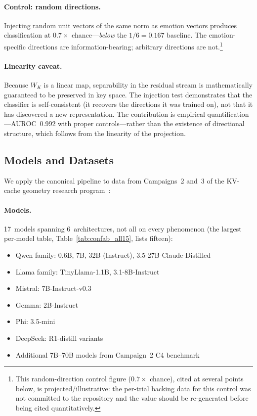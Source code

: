 \documentclass[11pt,a4paper]{article}
\begin{document}
\paragraph{Control: random directions.} Injecting random unit vectors of the
same norm as emotion vectors produces classification at $0.7\times$
chance---\emph{below} the $1/6 = 0.167$ baseline. The emotion-specific
directions are information-bearing; arbitrary directions are not.\footnote{This random-direction control figure ($0.7\times$ chance), cited at several points below, is projected/illustrative: the per-trial backing data for this control was not committed to the repository and the value should be re-generated before being cited quantitatively.}

\paragraph{Linearity caveat.} Because $W_K$ is a linear map, separability
in the residual stream is mathematically guaranteed to be preserved in key
space. The injection test demonstrates that the classifier is self-consistent
(it recovers the directions it was trained on), not that it has discovered
a new representation. The contribution is empirical quantification---AUROC~0.992
with proper controls---rather than the existence of directional structure,
which follows from the linearity of the projection.

\subsection{Models and Datasets}
\label{sec:datasets}

We apply the canonical pipeline to data from Campaigns~2 and~3 of the
KV-cache geometry research program~\citep{lyra_p2,lyra_spectral,lyra_delta}:

\paragraph{Models.} 17~models spanning 6~architectures, not all on every
phenomenon (the largest per-model table, Table~\ref{tab:confab_all15}, lists
fifteen):
\begin{itemize}[nosep]
    \item Qwen family: 0.6B, 7B, 32B (Instruct), 3.5-27B-Claude-Distilled
    \item Llama family: TinyLlama-1.1B, 3.1-8B-Instruct
    \item Mistral: 7B-Instruct-v0.3
    \item Gemma: 2B-Instruct
    \item Phi: 3.5-mini
    \item DeepSeek: R1-distill variants
    \item Additional 7B--70B models from Campaign~2 C4 benchmark
\end{itemize}
\end{document}
